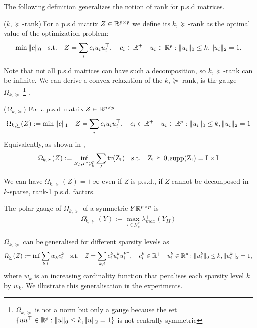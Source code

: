 The following definition generalizes the notion of rank for p.s.d matrices.
\begin{mydef}
($k,\succeq$-rank) For a p.s.d  matrix $Z\in\mathbb{R}^{p\times p}$ we define its $k,\succeq$-rank as the optimal
value of the optimization problem:
\begin{align}
\min \|c\|_0 \quad \text{s.t.} \quad Z=\sum_{i} c_i u_i u_{i}^\top, \quad c_i\in \mathbb{R}^{+} \quad u_{i}\in\mathbb{R}^p  :   \|u_{i}\|_0 \leq k, \|u_{i}\|_2 = 1.
\end{align}
\end{mydef}
Note that not all p.s.d matrices can have such a decomposition, so $k,\succeq$-rank can be infinite. We can derive a convex relaxation of the $k,\succeq$-rank, is the gauge $\Omega_{k,\succeq}$ \footnote{$\Omega_{k,\succeq}$ is not a norm but only a gauge because the set $\{u u^\top \in\mathbb{R}^p  :   \|u\|_0 \leq k, \|u\|_2 = 1\}$  is not centrally symmetric} . 
\begin{mydef}
($\Omega_{k,\succeq}$) For a p.s.d  matrix $Z\in\mathbb{R}^{p\times p}$ 
\begin{align}
\Omega_{k,\succeq}(Z):=\min \|c\|_1 \quad Z=\sum_{i} c_i u_i u_{i}^\top, \quad c_i\in \mathbb{R}^{+} \quad u_{i}\in\mathbb{R}^p  :   \|u_{i}\|_0 \leq k, \|u_{i}\|_2 = 1
\end{align}
Equivalently, as shown in \citet{richard2014tight}, 
\begin{align}
\Omega_{k,\succeq}(Z):=\inf_{Z_I, I\in\mathcal{G}^p_k} \sum_{I}\rm tr(Z_I) \quad \text{s.t.} \quad Z_I\succeq 0 ,\text{supp}(Z_I)=I\times I
\end{align}
\end{mydef}

We can have $\Omega_{k,\succeq}(Z)=+\infty$ even if $Z$ is p.s.d., if $Z$ cannot be decomposed in $k$-sparse,  rank-1 p.s.d. factors.

\begin{lemm} The polar gauge of $\Omega_{k,\succeq}$ of a symmetric $Y\mathbb{R}^{p\times p}$ is
\begin{align}
\Omega_{k,\succeq}^{\circ}(Y):= \max_{I\in\mathcal{G}^p_k}\lambda^{+}_{max}(Y_{II})
\end{align}
\end{lemm}

$\Omega_{k,\succeq}$ can be generalised for different sparsity levels as
\begin{align}
\Omega_{\succeq}(Z):=\inf \sum_{k,i}w_{k}c_i^k \quad \text{s.t.} \quad Z=\sum_{k,i} c_i^k u_i^k u_{i}^{k\top}, \quad c_i^k\in \mathbb{R}^{+} \quad u_{i}^k\in\mathbb{R}^p  :   \|u_{i}^k\|_0 \leq k, \|u_{i}^k\|_2 = 1,
\end{align}
where $w_{k}$ is an increasing cardinality function that penalises each sparsity level $k$ by $w_{k}$. We illustrate this generalisation in the experiments.

